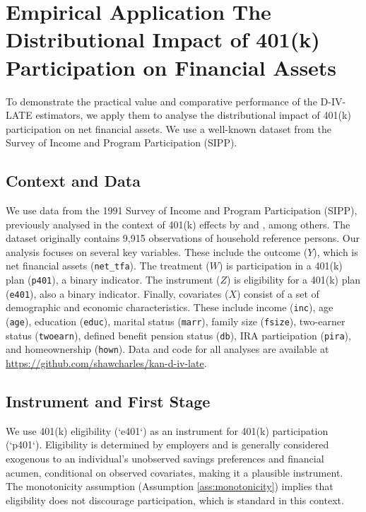 \documentclass[final,3p,fleqn, 10pt]{elsarticle}
\begin{document}
\section{Empirical Application The Distributional Impact of 401(k) Participation on Financial Assets}
\label{sec:empirical_app}

To demonstrate the practical value and comparative performance of the D-IV-LATE estimators, we apply them to analyse the distributional impact of 401(k) participation on net financial assets. We use a well-known dataset from the Survey of Income and Program Participation (SIPP).

\subsection{Context and Data}
We use data from the 1991 Survey of Income and Program Participation (SIPP), previously analysed in the context of 401(k) effects by \citet{chernozhukov2004impact} and \citet{belloni2014high}, among others. The dataset originally contains 9,915 observations of household reference persons. Our analysis focuses on several key variables. These include the outcome ($Y$), which is net financial assets (\texttt{net\_tfa}). The treatment ($W$) is participation in a 401(k) plan (\texttt{p401}), a binary indicator. The instrument ($Z$) is eligibility for a 401(k) plan (\texttt{e401}), also a binary indicator. Finally, covariates ($X$) consist of a set of demographic and economic characteristics. These include income (\texttt{inc}), age (\texttt{age}), education (\texttt{educ}), marital status (\texttt{marr}), family size (\texttt{fsize}), two-earner status (\texttt{twoearn}), defined benefit pension status (\texttt{db}), IRA participation (\texttt{pira}), and homeownership (\texttt{hown}).
Data and code for all analyses are available at \url{https://github.com/shawcharles/kan-d-iv-late}.

\subsection{Instrument and First Stage}
We use 401(k) eligibility (`e401`) as an instrument for 401(k) participation (`p401`). Eligibility is determined by employers and is generally considered exogenous to an individual's unobserved savings preferences and financial acumen, conditional on observed covariates, making it a plausible instrument. The monotonicity assumption (Assumption \ref{ass:monotonicity}) implies that eligibility does not discourage participation, which is standard in this context.
\end{document}
